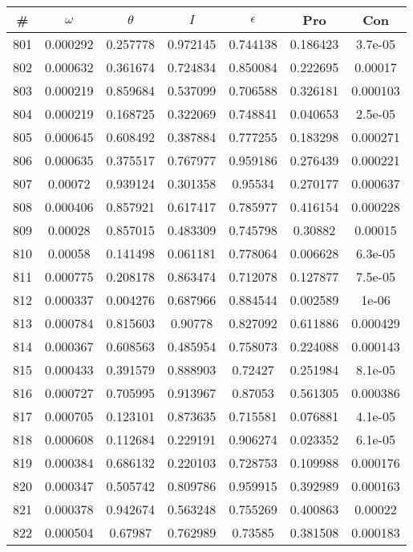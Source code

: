 \newpage
\begin{table}
\begin{tabular}{c|c|c|c|c|c|c}
\# & $\omega$ & $\theta$ & $I$ & $\epsilon$ & Pro & Con\\
\hline
801 & 0.000292 & 0.257778 & 0.972145 & 0.744138 & 0.186423 & 3.7e-05\\
802 & 0.000632 & 0.361674 & 0.724834 & 0.850084 & 0.222695 & 0.00017\\
803 & 0.000219 & 0.859684 & 0.537099 & 0.706588 & 0.326181 & 0.000103\\
804 & 0.000219 & 0.168725 & 0.322069 & 0.748841 & 0.040653 & 2.5e-05\\
805 & 0.000645 & 0.608492 & 0.387884 & 0.777255 & 0.183298 & 0.000271\\
806 & 0.000635 & 0.375517 & 0.767977 & 0.959186 & 0.276439 & 0.000221\\
807 & 0.00072 & 0.939124 & 0.301358 & 0.95534 & 0.270177 & 0.000637\\
808 & 0.000406 & 0.857921 & 0.617417 & 0.785977 & 0.416154 & 0.000228\\
809 & 0.00028 & 0.857015 & 0.483309 & 0.745798 & 0.30882 & 0.00015\\
810 & 0.00058 & 0.141498 & 0.061181 & 0.778064 & 0.006628 & 6.3e-05\\
811 & 0.000775 & 0.208178 & 0.863474 & 0.712078 & 0.127877 & 7.5e-05\\
812 & 0.000337 & 0.004276 & 0.687966 & 0.884544 & 0.002589 & 1e-06\\
813 & 0.000784 & 0.815603 & 0.90778 & 0.827092 & 0.611886 & 0.000429\\
814 & 0.000367 & 0.608563 & 0.485954 & 0.758073 & 0.224088 & 0.000143\\
815 & 0.000433 & 0.391579 & 0.888903 & 0.72427 & 0.251984 & 8.1e-05\\
816 & 0.000727 & 0.705995 & 0.913967 & 0.87053 & 0.561305 & 0.000386\\
817 & 0.000705 & 0.123101 & 0.873635 & 0.715581 & 0.076881 & 4.1e-05\\
818 & 0.000608 & 0.112684 & 0.229191 & 0.906274 & 0.023352 & 6.1e-05\\
819 & 0.000384 & 0.686132 & 0.220103 & 0.728753 & 0.109988 & 0.000176\\
820 & 0.000347 & 0.505742 & 0.809786 & 0.959915 & 0.392989 & 0.000163\\
821 & 0.000378 & 0.942674 & 0.563248 & 0.755269 & 0.400863 & 0.00022\\
822 & 0.000504 & 0.67987 & 0.762989 & 0.73585 & 0.381508 & 0.000183\\

\end{tabular}
\end{table}
